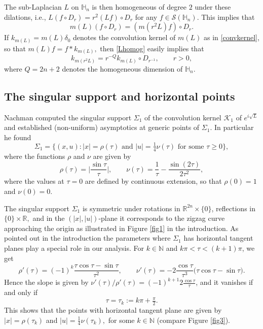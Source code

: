 \documentclass[leqno]{amsart}
\theoremstyle{definition}
\theoremstyle{remark}
\numberwithin{equation}{section}
\newcommand{\N}{\mathbb{N}}
\newcommand\bbH{{\mathbb {H}}}
\newcommand\bbR{{\mathbb {R}}}
\newcommand\sK{{\mathscr {K}}}
\begin{document}
The sub-Laplacian $L$ on  $\mathbb H_n$ is then homogeneous of degree $2$ under these dilations,    i.e., $L(f\circ D_r)=r^2 (L f)\circ D_r$ for any $f\in \mathcal S(\bbH_n).$ This implies that 
\begin{equation}\label{Lhomog}
m( L)(f\circ D_r)=(m(r^2L) f)\circ D_r.
\end{equation}
If $k_{m(L)}=m(L)\delta_0$ denotes the convolution kernel of $m(L)$ as in  \eqref{convkernel},  so that $m(L)f=f*k_{m(L)},$ then \eqref{Lhomog} easily implies that 
\begin{equation}\label{mrrL}
k_{m(r^2L)}=r^{-Q}k_{m(L)}\circ D_{r^{-1}}, \qquad r>0,
\end{equation}
where $Q=2n+2$ denotes the homogeneous dimension of $\bbH_n.$

 
\subsection{The singular support and horizontal points}

Nachman \cite{Na82} computed the singular support $\Sigma_1$  of the convolution  kernel $\sK_1$ of ${e^{i\sqrt L}}$ and established (non-uniform)  asymptotics at generic points of $\Sigma_1$.  In particular he found
\begin{equation}
\Sigma_1= \{ (x, u):  |x|= \rho(\tau) \text{ and }  |u|=\tfrac 14 \nu(\tau) \text{ for some } \tau\ge 0 \}, 
\end{equation}
where  the  functions $\rho$ and $\nu$ are given by 
\[
\rho(\tau) = \Big| \frac{\sin \tau}{\tau}\Big|,\quad\quad
\nu(\tau) = \frac 1{\tau} - \frac{\sin(2\tau)}{2\tau^2},
\]
where the values at $\tau=0$ are defined by continuous extension, so that $\rho(0)=1$ and $\nu(0)=0$. 

The singular support $\Sigma_1$ is symmetric under rotations in $\bbR^{2n}\times \{0\}$, reflections in $\{0\}\times \bbR,$  and in the $(|x|,|u|)$-plane it corresponds to the  zigzag curve approaching the origin as  illustrated in Figure \ref{fig1} in the introduction. 
As pointed out in the introduction the parameters where $\Sigma_1$ has horizontal tangent planes play a special role in our analysis.
For $k\in \mathbb{N}$ and  $k\pi<\tau<(k+1)\pi$,  we get 
$$ \rho'(\tau)=(-1)^k\frac {\tau\cos\tau-\sin \tau}{\tau^2},\qquad \nu'(\tau)=-2\frac {\cos \tau}{\tau^3}\big(\tau\cos\tau-\sin \tau\big).
$$ 
Hence the slope is given by $\nu'(\tau)/\rho'(\tau) = (-1)^{k+1}2\frac {\cos \tau}{\tau}$, and it vanishes if and only if 
\begin{equation}\label{hpoint}
\tau=\tau_k:=k\pi+\tfrac \pi 2.
\end{equation}
This shows that the points with horizontal tangent plane  are given by $|x|=\rho(\tau_k)$ and $|u|=\frac14\nu(\tau_k),$ for some $k\in \N$ (compare Figure \ref{fig3}).
\end{document}
